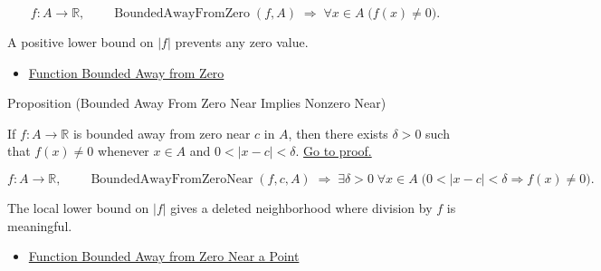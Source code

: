 \begin{remark*}
\[
  f\colon A\to\mathbb{R},\qquad\operatorname{BoundedAwayFromZero}(f,A)
  \;\Longrightarrow\;
  \forall x\in A\;\bigl(f(x)\neq0\bigr).
\]
\end{remark*}

\begin{remark*}[Interpretation]
A positive lower bound on \(|f|\) prevents any zero value.
\end{remark*}

\begin{dependencies}
\begin{itemize}
  \item \hyperref[def:function-bounded-away-from-zero]{Function Bounded Away from Zero}
\end{itemize}
\end{dependencies}

\begin{propositionbox}{Proposition (Bounded Away From Zero Near Implies Nonzero Near)}
\begin{proposition}
\label{prop:bounded-away-from-zero-near-implies-nonzero-near}
If \(f:A\to\mathbb{R}\) is bounded away from zero near \(c\) in \(A\), then
there exists \(\delta>0\) such that \(f(x)\neq0\) whenever \(x\in A\) and
\(0<|x-c|<\delta\).
\hyperref[prf:bounded-away-from-zero-near-implies-nonzero-near]{Go to proof.}
\end{proposition}
\end{propositionbox}

\begin{remark*}
\[
  f\colon A\to\mathbb{R},\qquad\operatorname{BoundedAwayFromZeroNear}(f,c,A)
  \;\Longrightarrow\;
  \exists\delta>0\;\forall x\in A\;
  \bigl(0<|x-c|<\delta\Rightarrow f(x)\neq0\bigr).
\]
\end{remark*}

\begin{remark*}[Interpretation]
The local lower bound on \(|f|\) gives a deleted neighborhood where division by
\(f\) is meaningful.
\end{remark*}

\begin{dependencies}
\begin{itemize}
  \item \hyperref[def:function-bounded-away-from-zero-near]{Function Bounded Away from Zero Near a Point}
\end{itemize}
\end{dependencies}

